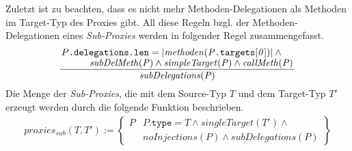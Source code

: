 \documentclass[a4paper,12pt]{article}
\begin{document}
Zuletzt ist zu beachten, dass es nicht mehr Methoden-Delegationen als Methoden im Target-Typ des Proxies gibt. All diese Regeln bzgl. der Methoden-Delegationen eines \emph{Sub-Proxies} werden in folgender Regel zusammengefasst.
\begin{gather*}
\frac{
\splitfrac{P\texttt{.delegations.len} = |\mathit{methoden(P\texttt{.targets}[0])}| \wedge \mathit{ }}
{\mathit{subDelMeth(P)} \wedge \mathit{simpleTarget(P)} \wedge \mathit{callMeth(P)}}
}
{\mathit{subDelegations(P)}}
\end{gather*}
Die Menge der \emph{Sub-Proxies}, die mit dem Source-Typ $T$ und dem Target-Typ $T'$ erzeugt werden durch die folgende Funktion beschrieben.
\begin{gather*}
\mathit{proxies_{sub}(T,T')} := 
\left\{\begin{array}{l|l}
	P	& P\texttt{.type} = T \wedge\mathit{singleTarget(T')} \wedge \mathit{ }\\
		& \mathit{noInjections(P)} \wedge \mathit{subDelegations(P)} 
		 \end{array}
\right\}
\end{gather*}
\end{document}
